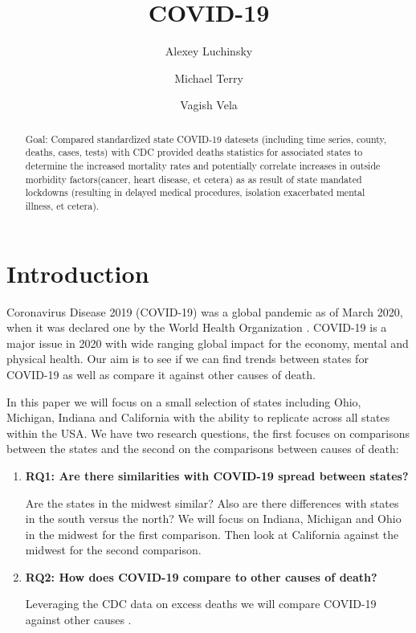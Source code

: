 \documentclass[conference]{IEEEtran}
\begin{document}
\title{COVID-19}
\author{Alexey Luchinsky \and Michael Terry  \and Vagish Vela}
\maketitle

\begin{abstract}
Goal: Compared standardized state COVID-19 datesets (including time series, county, deaths, cases, tests) with CDC provided deaths statistics for associated states to determine the increased mortality rates and potentially correlate increases in outside morbidity factors(cancer, heart disease, et cetera) as as result of state mandated lockdowns (resulting in delayed medical procedures, isolation exacerbated mental illness, et cetera).
  \blindtext
\end{abstract}

\section{Introduction}

Coronavirus Disease 2019 (COVID-19) was a global pandemic as of March 2020, when it was declared one by the World Health Organization \cite{cucinotta_who_2020}.
COVID-19 is a major issue in 2020 with wide ranging global impact for the economy, mental and physical health.
Our aim is to see if we can find trends between states for COVID-19 as well as compare it against other causes of death.

In this paper we will focus on a small selection of states including Ohio, Michigan, Indiana and California with the ability to replicate across all states within the USA.
We have two research questions, the first focuses on comparisons between the states and the second on the comparisons between causes of death:
\begin{enumerate}
  \item \textbf{RQ1: Are there similarities with COVID-19 spread between states?}
  
  Are the states in the midwest similar? Also are there differences with states in the south versus the north?
  We will focus on Indiana, Michigan and Ohio in the midwest for the first comparison. Then look at California against the midwest for the second comparison.

  \item \textbf{RQ2: How does COVID-19 compare to other causes of death?}
  
  Leveraging the CDC data on excess deaths we will compare COVID-19 against other causes \cite{cdc_weekly_nodate}.
\end{enumerate}
\end{document}
